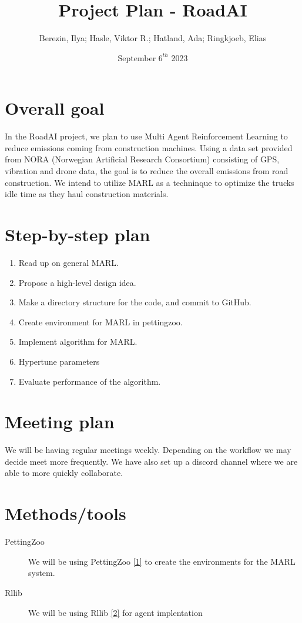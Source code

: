 \documentclass{article}
\title{Project Plan - RoadAI}
\author{Berezin, Ilya; Hasle, Viktor R.; Hatland, Ada; Ringkjoeb, Elias}
\date{September $6^{th}$ 2023}
\begin{document}
\begin{titlepage}
\maketitle
\tableofcontents
\end{titlepage}


\section{Overall goal}
In the RoadAI project, we plan to use Multi Agent Reinforcement Learning to reduce emissions coming from
construction machines. Using a data set provided from NORA (Norwegian Artificial Research Consortium) consisting of GPS, vibration and drone data, the goal is to reduce the overall emissions from road construction. We intend to utilize MARL as a techninque to optimize
the trucks idle time as they haul construction materials.

\section{Step-by-step plan}
\begin{enumerate}
  \item Read up on general MARL.
  \item Propose a high-level design idea.
  \item Make a directory structure for the code, and commit to GitHub.
  \item Create environment for MARL in pettingzoo.
  \item Implement algorithm for MARL. 
  \item Hypertune parameters
  \item Evaluate performance of the algorithm.
\end{enumerate}


\section{Meeting plan}
We will be having regular meetings weekly. Depending on the workflow we may decide meet more frequently.
We have also set up a discord channel where we are able to more quickly collaborate.
\section{Methods/tools}
\begin{description}
  \item[PettingZoo] We will be using PettingZoo \href{https://pettingzoo.farama.org}{[1]} to create the environments for the MARL system.
  \item[Rllib] We will be using Rllib \href{https://docs.ray.io/en/latest/rllib/index.html}{[2]} for agent implentation
\end{description}
\end{document}
